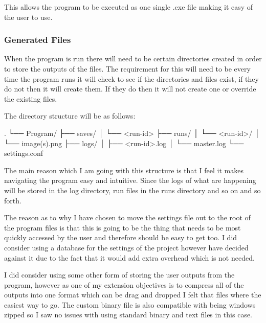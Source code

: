 \begin{FlushLeft}
    This allows the program to be executed as one single .exe file making it easy of the user to use.\\ 

    \bk

    \subsubsection{Generated Files}
    When the program is run there will need to be certain directories created in order to store the outputs of the files. The requirement for this will need to be every time the program runs it will check to see if the directories and files exist, if they do not then it will create them. If they do then it will not create one or override the existing files. \\ \bk

    The directory structure will be as follows:
    \begin{pseudocode}
    .
    └── Program/
        ├── saves/
        │   └── <run-id>
        ├── runs/
        │   └── <run-id>/
        │       └── image(s).png
        ├── logs/
        │   ├── <run-id>.log
        │   └── master.log
        └── settings.conf
    \end{pseudocode}

    The main reason which I am going with this structure is that I feel it makes navigating the program easy and intuitive. Since the logs of what are happening will be stored in the log directory, run files in the runs directory and so on and so forth. \\ \bk

    The reason as to why I have chosen to move the settings file out to the root of the program files is that this is going to be the thing that needs to be most quickly accessed by the user and therefore should be easy to get too. I did consider using a database for the settings of the project however have decided against it due to the fact that it would add extra overhead which is not needed. \\ \bk

    I did consider using some other form of storing the user outputs from the program, however as one of my extension objectives is to compress all of the outputs into one format which can be drag and dropped I felt that files where the easiest way to go. The custom binary file is also compatible with being windows zipped so I saw no issues with using standard binary and text files in this case. \\ \bk


\end{FlushLeft}
